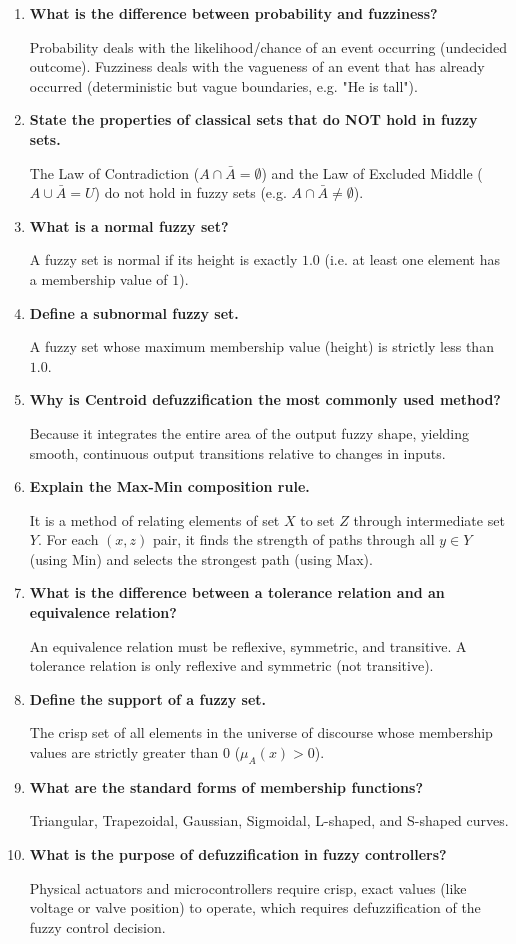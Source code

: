 \documentclass[12pt,a4paper]{article}
\newcommand{\Q}[1]{\textbf{#1}\par\noindent\ignorespaces}
\begin{document}
\begin{tcolorbox}[exambox, title={\textbf{Frequently Asked / Viva Questions}}]
\begin{enumerate}[leftmargin=*, itemsep=3.5pt, label=\arabic*.]
  \item \Q{What is the difference between probability and fuzziness?} Probability deals with the likelihood/chance of an event occurring (undecided outcome). Fuzziness deals with the vagueness of an event that has already occurred (deterministic but vague boundaries, e.g. "He is tall").
  \item \Q{State the properties of classical sets that do NOT hold in fuzzy sets.} The Law of Contradiction ($A \cap \bar{A} = \emptyset$) and the Law of Excluded Middle ($A \cup \bar{A} = U$) do not hold in fuzzy sets (e.g. $A \cap \bar{A} \neq \emptyset$).
  \item \Q{What is a normal fuzzy set?} A fuzzy set is normal if its height is exactly $1.0$ (i.e. at least one element has a membership value of $1$).
  \item \Q{Define a subnormal fuzzy set.} A fuzzy set whose maximum membership value (height) is strictly less than $1.0$.
  \item \Q{Why is Centroid defuzzification the most commonly used method?} Because it integrates the entire area of the output fuzzy shape, yielding smooth, continuous output transitions relative to changes in inputs.
  \item \Q{Explain the Max-Min composition rule.} It is a method of relating elements of set $X$ to set $Z$ through intermediate set $Y$. For each $(x,z)$ pair, it finds the strength of paths through all $y \in Y$ (using Min) and selects the strongest path (using Max).
  \item \Q{What is the difference between a tolerance relation and an equivalence relation?} An equivalence relation must be reflexive, symmetric, and transitive. A tolerance relation is only reflexive and symmetric (not transitive).
  \item \Q{Define the support of a fuzzy set.} The crisp set of all elements in the universe of discourse whose membership values are strictly greater than $0$ ($\mu_A(x) > 0$).
  \item \Q{What are the standard forms of membership functions?} Triangular, Trapezoidal, Gaussian, Sigmoidal, L-shaped, and S-shaped curves.
  \item \Q{What is the purpose of defuzzification in fuzzy controllers?} Physical actuators and microcontrollers require crisp, exact values (like voltage or valve position) to operate, which requires defuzzification of the fuzzy control decision.
\end{enumerate}
\end{tcolorbox}
\end{document}

